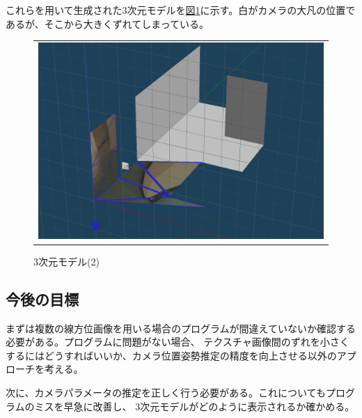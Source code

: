 \documentclass[]{jarticle}          %
\begin{document}
これらを用いて生成された3次元モデルを\hyperref[four]{図\ref{six}}に示す。白がカメラの大凡の位置であるが、そこから大きくずれてしまっている。

\begin{figure}[H]
  \begin{center}
    \begin{tabular}{c}
      \includegraphics[keepaspectratio, scale=0.3]{figures/C5F3.png}
    \end{tabular}
  \end{center}
  \caption{3次元モデル(2)}
  \label{six}
\end{figure}

\subsection{今後の目標}
まずは複数の線方位画像を用いる場合のプログラムが間違えていないか確認する必要がある。プログラムに問題がない場合、
テクスチャ画像間のずれを小さくするにはどうすればいいか、カメラ位置姿勢推定の精度を向上させる以外のアプローチを考える。

次に、カメラパラメータの推定を正しく行う必要がある。これについてもプログラムのミスを早急に改善し、
3次元モデルがどのように表示されるか確かめる。
\end{document}
